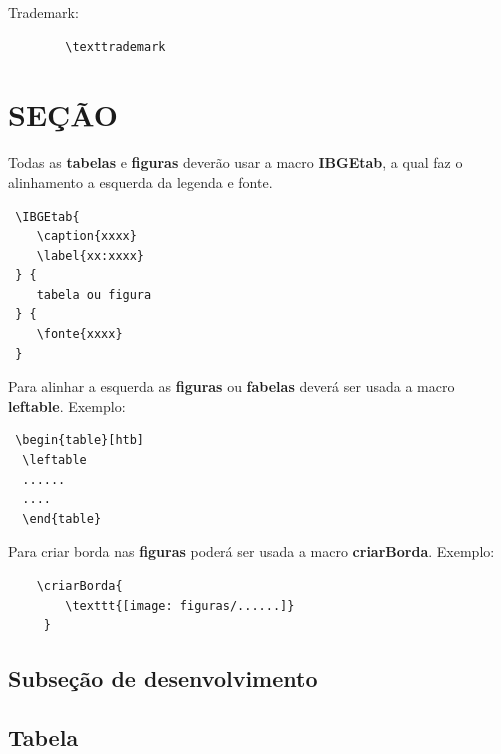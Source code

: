 	\texttrademark Trademark:
		\begin{verbatim}
		\texttrademark
		\end{verbatim}
\section{SEÇÃO}

 Todas as \textbf{tabelas} e \textbf{figuras} deverão usar a macro \textbf{IBGEtab}, a qual faz o alinhamento a esquerda da legenda e fonte.
 \begin{verbatim}
 \IBGEtab{
 	\caption{xxxx} 
 	\label{xx:xxxx}
 } {
 	tabela ou figura
 } {
 	\fonte{xxxx}
 }
 \end{verbatim} 
 
 Para alinhar a esquerda as \textbf{figuras} ou \textbf{fabelas} deverá ser usada a macro  \textbf{leftable}. Exemplo:
 \begin{verbatim}
 \begin{table}[htb]
  \leftable
  ......
  ....
  \end{table}
 \end{verbatim}
 
 Para criar borda nas \textbf{figuras} poderá ser usada a macro \textbf{criarBorda}. Exemplo:
 \begin{verbatim}
 	\criarBorda{
  		\texttt{[image: figuras/......]}
     }
 \end{verbatim}
\subsection{Subseção de desenvolvimento}

\lipsum[1-1]

\subsection{Tabela}
\begin{table}[htb]
  \leftable  %
\end{table}

